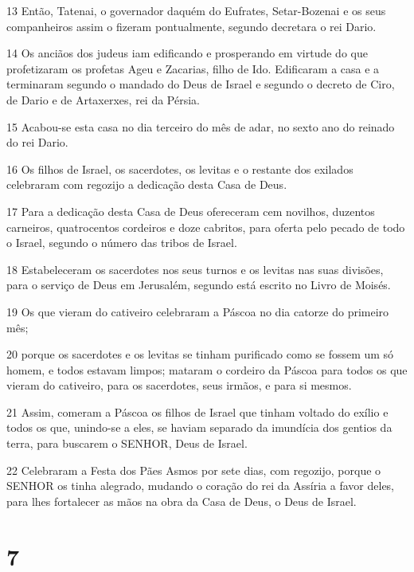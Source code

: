 \par 13 Então, Tatenai, o governador daquém do Eufrates, Setar-Bozenai e os seus companheiros assim o fizeram pontualmente, segundo decretara o rei Dario.
\par 14 Os anciãos dos judeus iam edificando e prosperando em virtude do que profetizaram os profetas Ageu e Zacarias, filho de Ido. Edificaram a casa e a terminaram segundo o mandado do Deus de Israel e segundo o decreto de Ciro, de Dario e de Artaxerxes, rei da Pérsia.
\par 15 Acabou-se esta casa no dia terceiro do mês de adar, no sexto ano do reinado do rei Dario.
\par 16 Os filhos de Israel, os sacerdotes, os levitas e o restante dos exilados celebraram com regozijo a dedicação desta Casa de Deus.
\par 17 Para a dedicação desta Casa de Deus ofereceram cem novilhos, duzentos carneiros, quatrocentos cordeiros e doze cabritos, para oferta pelo pecado de todo o Israel, segundo o número das tribos de Israel.
\par 18 Estabeleceram os sacerdotes nos seus turnos e os levitas nas suas divisões, para o serviço de Deus em Jerusalém, segundo está escrito no Livro de Moisés.
\par 19 Os que vieram do cativeiro celebraram a Páscoa no dia catorze do primeiro mês;
\par 20 porque os sacerdotes e os levitas se tinham purificado como se fossem um só homem, e todos estavam limpos; mataram o cordeiro da Páscoa para todos os que vieram do cativeiro, para os sacerdotes, seus irmãos, e para si mesmos.
\par 21 Assim, comeram a Páscoa os filhos de Israel que tinham voltado do exílio e todos os que, unindo-se a eles, se haviam separado da imundícia dos gentios da terra, para buscarem o SENHOR, Deus de Israel.
\par 22 Celebraram a Festa dos Pães Asmos por sete dias, com regozijo, porque o SENHOR os tinha alegrado, mudando o coração do rei da Assíria a favor deles, para lhes fortalecer as mãos na obra da Casa de Deus, o Deus de Israel.

\chapter{7}


